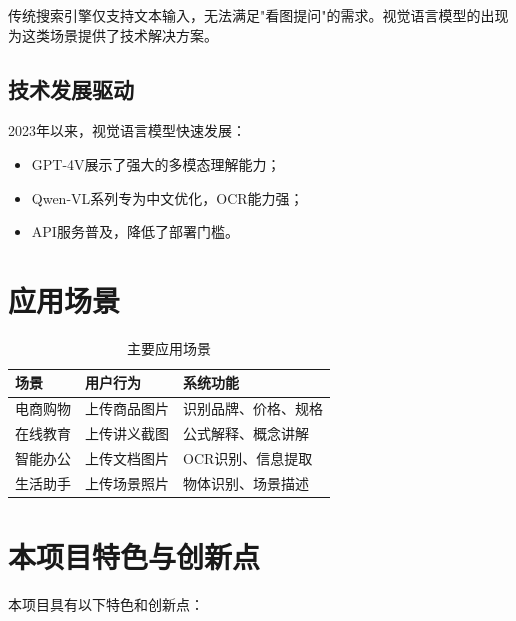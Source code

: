 传统搜索引擎仅支持文本输入，无法满足"看图提问"的需求。视觉语言模型的出现为这类场景提供了技术解决方案。

\subsection{技术发展驱动}

2023年以来，视觉语言模型快速发展：
\begin{itemize}
  \item GPT-4V展示了强大的多模态理解能力；
  \item Qwen-VL系列专为中文优化，OCR能力强；
  \item API服务普及，降低了部署门槛。
\end{itemize}

\section{应用场景}
\label{sec:applications}

\begin{table}[htbp]
  \centering
  \caption{主要应用场景}
  \label{tab:applications}
  \begin{tabular}{|l|l|l|}
    \hline
    \textbf{场景} & \textbf{用户行为} & \textbf{系统功能} \\
    \hline
    电商购物 & 上传商品图片 & 识别品牌、价格、规格 \\
    \hline
    在线教育 & 上传讲义截图 & 公式解释、概念讲解 \\
    \hline
    智能办公 & 上传文档图片 & OCR识别、信息提取 \\
    \hline
    生活助手 & 上传场景照片 & 物体识别、场景描述 \\
    \hline
  \end{tabular}
\end{table}

\section{本项目特色与创新点}
\label{sec:innovation}

本项目具有以下特色和创新点：

